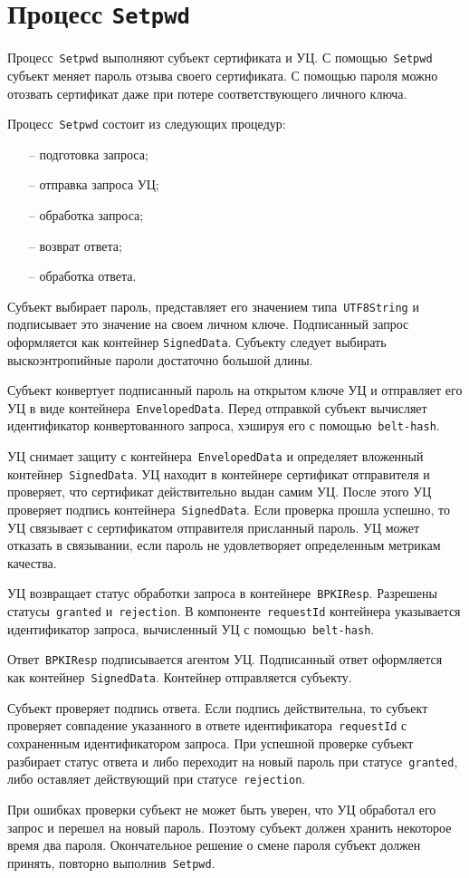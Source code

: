 \section{Процесс \texttt{Setpwd}}\label{PROCESSES.Setpwd}

Процесс~\texttt{Setpwd} выполняют субъект сертификата и УЦ.
С помощью~\texttt{Setpwd} субъект меняет пароль отзыва своего 
сертификата. С помощью пароля можно отозвать сертификат даже при потере 
соответствующего личного ключа.

Процесс~\texttt{Setpwd} состоит из следующих процедур:
\begin{itemize}
\item[--]
подготовка запроса;
\item[--]
отправка запроса УЦ;
\item[--]
обработка запроса;
\item[--]
возврат ответа;
\item[--]
обработка ответа.
\end{itemize}

Субъект выбирает пароль, представляет его значением типа~\texttt{UTF8String}
и подписывает это значение на своем личном ключе.
Подписанный запрос оформляется как контейнер \texttt{SignedData}.
%
Субъекту следует выбирать выскоэнтропийные пароли достаточно большой 
длины.

Субъект конвертует подписанный пароль на открытом ключе УЦ
и отправляет его УЦ в виде контейнера~\texttt{EnvelopedData}.
Перед отправкой субъект вычисляет идентификатор конвертованного запроса,
хэшируя его с помощью~\texttt{belt-hash}.

УЦ снимает защиту с контейнера~\texttt{EnvelopedData} и определяет 
вложенный контейнер~\texttt{SignedData}. УЦ находит в контейнере
сертификат отправителя и проверяет, что сертификат действительно 
выдан самим УЦ. После этого УЦ проверяет подпись 
контейнера~\texttt{SignedData}. Если проверка прошла успешно, то УЦ  
связывает с сертификатом отправителя присланный пароль. УЦ может отказать 
в связывании, если пароль не удовлетворяет определенным метрикам качества.

УЦ возвращает статус обработки запроса в контейнере~\texttt{BPKIResp}.
Разрешены статусы~\texttt{granted} и~\texttt{rejection}.
В компоненте~\texttt{requestId} контейнера указывается идентификатор 
запроса, вычисленный УЦ с помощью~\texttt{belt-hash}.

Ответ~\texttt{BPKIResp} подписывается агентом УЦ. 
Подписанный ответ оформляется как контейнер~\texttt{SignedData}. Контейнер 
отправляется субъекту.

Субъект проверяет подпись ответа. Если подпись действительна,
то субъект проверяет совпадение указанного в ответе 
идентификатора~\texttt{requestId} с сохраненным идентификатором запроса. 
При успешной проверке субъект разбирает статус ответа и либо переходит 
на новый пароль при статусе~\texttt{granted}, либо оставляет действующий
при статусе~\texttt{rejection}. 

При ошибках проверки субъект не может быть уверен, что УЦ обработал
его запрос и перешел на новый пароль. Поэтому субъект должен хранить  
некоторое время два пароля. Окончательное решение о смене пароля 
субъект должен принять, повторно выполнив~\texttt{Setpwd}.
